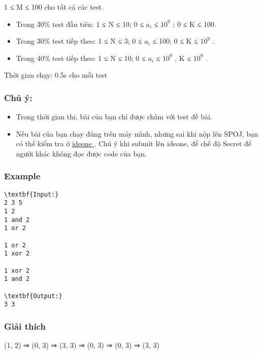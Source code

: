    1 ≤ M ≤ 100 cho tất cả các test.  
\begin{itemize}
	\item      Trong 30\% test đầu tiên: 1 ≤ N ≤ 10; 0 ≤ $a_{i}$     ≤ $10^{9}$     ; 0 ≤ K ≤ 100.    
	\item      Trong 30\% test tiếp theo: 1 ≤ N ≤ 3; 0 ≤ $a_{i}$     ≤ 100; 0 ≤ K ≤ $10^{9}$     .    
	\item      Trong 40\% test tiếp theo: 1 ≤ N ≤ 10; 0 ≤ $a_{i}$      ≤ $10^{9}$     , K ≤ $10^{9}$     .    
\end{itemize}

   Thời gian chạy: 0.5s cho mỗi test  

\subsubsection{   Chú ý:  }
\begin{itemize}
	\item     Trong thời gian thi, bài của bạn chỉ được chấm với test đề bài.   
	\item     Nếu bài của bạn chạy đúng trên máy mình, nhưng sai khi nộp lên SPOJ, bạn có thể kiểm tra ở    \href{https://ideone.com}{     ideone    }    . Chú ý khi submit lên ideone, để chế độ Secret để người khác không đọc được code của bạn.   
\end{itemize}

\subsubsection{   Example  }
\begin{verbatim}
\textbf{Input:}
2 3 5
1 2
1 and 2
1 or 2

1 or 2
1 xor 2

1 xor 2
1 and 2 

\textbf{Output:}
3 3
\end{verbatim}

\subsubsection{     Giải thích    }

     (1, 2) ⇒ (0, 3) ⇒ (3, 3) ⇒ (0, 3) ⇒ (0, 3) ⇒ (3, 3)    

